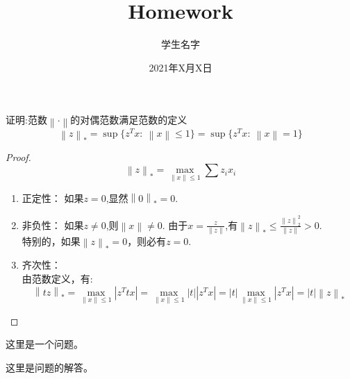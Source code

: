 \documentclass[12pt,cn]{homework}
\title{Homework}
\author{学生名字} %
\date{2021年X月X日}
\institute{上海师范大学数理学院} %
\newcommand{\norm}[1]{\left\lVert#1\right\rVert}
\begin{document}
\maketitle %




\begin{problem}
证明:范数$\norm{\cdot}$的对偶范数满足范数的定义
	\begin{equation*}
	    \norm{z}_*=\sup\{z^Tx:\ \norm{x}\leq1\}=\sup\{z^Tx:\ \norm{x}=1\}
	\end{equation*}
\end{problem}
\begin{proof}
\begin{equation*}
        \norm{z}_*=\max_{\norm{x}\leq 1}\sum{z_ix_i}
    \end{equation*}
    \begin{enumerate}
    \item 正定性：
    如果$z=0$,显然$\norm{0}_*=0$.
    \item 非负性：
    如果$z\neq 0$,则$\norm{x}\neq 0$. 由于$x=\frac{z}{\norm{z}}$,有$\norm{z}_*\leq \frac{\norm{z}^2_2}{\norm{z}}>0$.\\
    特别的，如果$\norm{z}_*=0$，则必有$z=0$.
    \item 齐次性：\\
    由范数定义，有:
    \begin{equation*}
        \norm{tz}_*=\max_{\norm{x}\leq 1} | z^Ttx|=\max_{\norm{x}\leq 1}|t||z^Tx |=|t| \max_{\norm{x}\leq 1} | z^Tx |=|t|\norm{z}_*
    \end{equation*}
    \end{enumerate}
\end{proof}



\begin{problem}
	这里是一个问题。
\end{problem}
\begin{solution}
这里是问题的解答。
\end{solution}
\end{document}
